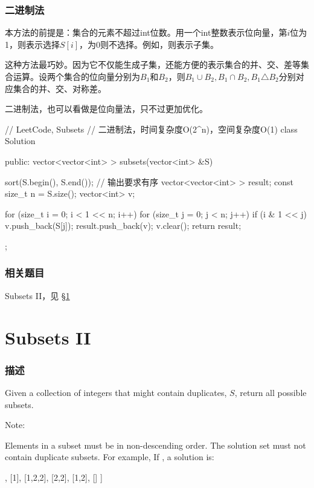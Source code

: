 \subsubsection{二进制法}
本方法的前提是：集合的元素不超过int位数。用一个int整数表示位向量，第$i$位为1，则表示选择$S[i]$，为0则不选择。例如，则表示子集。

这种方法最巧妙。因为它不仅能生成子集，还能方便的表示集合的并、交、差等集合运算。设两个集合的位向量分别为$B_1$和$B_2$，则$B_1\cup B_2, B_1 \cap B_2, B_1 \triangle B_2$分别对应集合的并、交、对称差。

二进制法，也可以看做是位向量法，只不过更加优化。

\begin{Code}
// LeetCode, Subsets
// 二进制法，时间复杂度O(2^n)，空间复杂度O(1)
class Solution {
public:
    vector<vector<int> > subsets(vector<int> &S) {
        sort(S.begin(), S.end()); // 输出要求有序
        vector<vector<int> > result;
        const size_t n = S.size();
        vector<int> v;

        for (size_t i = 0; i < 1 << n; i++) {
            for (size_t j = 0; j < n; j++) {
                if (i & 1 << j) v.push_back(S[j]);
            }
            result.push_back(v);
            v.clear();
        }
        return result;
    }
};
\end{Code}


\subsubsection{相关题目}
\begindot
\item Subsets II，见 \S \ref{sec:subsets-ii}
\myenddot


\section{Subsets II} %
\label{sec:subsets-ii}


\subsubsection{描述}
Given a collection of integers that might contain duplicates, $S$, return all possible subsets.

Note:

Elements in a subset must be in non-descending order.
The solution set must not contain duplicate subsets.
For example,
If , a solution is:
\begin{Code}
[
  [2],
  [1],
  [1,2,2],
  [2,2],
  [1,2],
  []
]
\end{Code}


